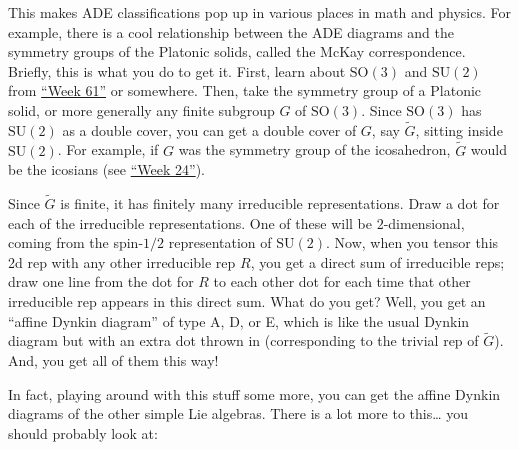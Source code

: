\documentclass{article}
\renewcommand{\texttt}[1]{%
  \begingroup
  \ttfamily
  \begingroup\lccode`~=`/\lowercase{\endgroup\def~}{/\discretionary{}{}{}}%
  \begingroup\lccode`~=`[\lowercase{\endgroup\def~}{[\discretionary{}{}{}}%
  \begingroup\lccode`~=`.\lowercase{\endgroup\def~}{.\discretionary{}{}{}}%
  \catcode`/=\active\catcode`[=\active\catcode`.=\active
  \scantokens{#1\noexpand}%
  \endgroup
}
\begin{document}
This makes ADE classifications pop up in various places in math and
physics. For example, there is a cool relationship between the ADE
diagrams and the symmetry groups of the Platonic solids, called the
McKay correspondence. Briefly, this is what you do to get it. First,
learn about \(\mathrm{SO}(3)\) and \(\mathrm{SU}(2)\) from
\protect\hyperlink{week61}{``Week 61''} or somewhere. Then, take the
symmetry group of a Platonic solid, or more generally any finite
subgroup \(G\) of \(\mathrm{SO}(3)\). Since \(\mathrm{SO}(3)\) has
\(\mathrm{SU}(2)\) as a double cover, you can get a double cover of
\(G\), say \(\widetilde{G}\), sitting inside \(\mathrm{SU}(2)\). For
example, if \(G\) was the symmetry group of the icosahedron,
\(\widetilde{G}\) would be the icosians (see
\protect\hyperlink{week24}{``Week 24''}).

Since \(\widetilde{G}\) is finite, it has finitely many irreducible
representations. Draw a dot for each of the irreducible representations.
One of these will be \(2\)-dimensional, coming from the spin-\(1/2\)
representation of \(\mathrm{SU}(2)\). Now, when you tensor this 2d rep
with any other irreducible rep \(R\), you get a direct sum of
irreducible reps; draw one line from the dot for \(R\) to each other dot
for each time that other irreducible rep appears in this direct sum.
What do you get? Well, you get an ``affine Dynkin diagram'' of type A,
D, or E, which is like the usual Dynkin diagram but with an extra dot
thrown in (corresponding to the trivial rep of \(\widetilde{G}\)). And,
you get all of them this way!

In fact, playing around with this stuff some more, you can get the
affine Dynkin diagrams of the other simple Lie algebras. There is a lot
more to this\ldots{} you should probably look at:

\end{document}
